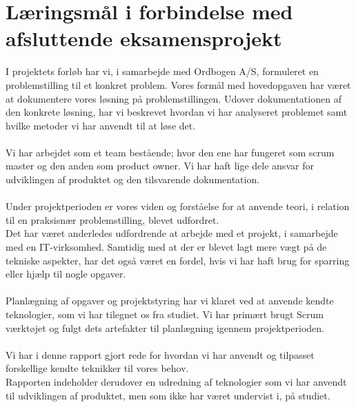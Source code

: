 \section{Læringsmål i forbindelse med afsluttende eksamensprojekt}
I projektets forløb har vi, i samarbejde med Ordbogen A/S, formuleret en problemstilling til et konkret problem.
Vores formål med hovedopgaven har været at dokumentere vores løsning på problemstillingen.
Udover dokumentationen af den konkrete løsning, har vi beskrevet hvordan vi har analyseret problemet samt
hvilke metoder vi har anvendt til at løse det.
\\\\
Vi har arbejdet som et team bestående; hvor den ene har fungeret som scrum master og den anden som product owner.
Vi har haft lige dele ansvar for udviklingen af produktet og den tilsvarende dokumentation.
\\\\
Under projektperioden er vores viden og forståelse for at anvende teori, i relation til en praksisnær problemstilling, blevet udfordret.
\\
Det har været anderledes udfordrende at arbejde med et projekt, i samarbejde med en IT-virksomhed.
Samtidig med at der er blevet lagt mere vægt på de tekniske aspekter, har det også været en fordel, hvis vi har haft brug for sparring eller hjælp til nogle opgaver.
\\\\
Planlægning af opgaver og projektstyring har vi klaret ved at anvende kendte teknologier, som vi har tilegnet os fra studiet.
Vi har primært brugt Scrum værktøjet og fulgt dets artefakter til planlægning igennem projektperioden.
\\\\
Vi har i denne rapport gjort rede for hvordan vi har anvendt og tilpasset forskellige kendte teknikker til vores behov.
\\
Rapporten indeholder derudover en udredning af teknologier som vi har anvendt til udviklingen af produktet, men som ikke har været undervist i, på studiet.
